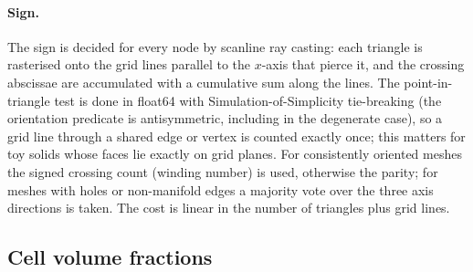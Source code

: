 \documentclass[11pt]{article}
\begin{document}
\paragraph{Sign.} The sign is decided for every node by scanline ray casting: each triangle is rasterised
onto the grid lines parallel to the $x$-axis that pierce it, and the crossing abscissae are accumulated
with a cumulative sum along the lines. The point-in-triangle test is done in float64 with
Simulation-of-Simplicity tie-breaking (the orientation predicate is antisymmetric, including in the
degenerate case), so a grid line through a shared edge or vertex is counted exactly once; this matters for
toy solids whose faces lie exactly on grid planes. For consistently oriented meshes the signed crossing
count (winding number) is used, otherwise the parity; for meshes with holes or non-manifold edges a
majority vote over the three axis directions is taken. The cost is linear in the number of triangles plus
grid lines.

\begin{table}[h]
\centering\small

\caption{Signed distance accuracy: exact distance $d$ (analytic for the cube; brute force over all
triangles for $2\cdot10^4$ random band nodes of the torus).}\label{tab:sdf}
\end{table}

\subsection{Cell volume fractions}\label{sec:fractions}
\end{document}
